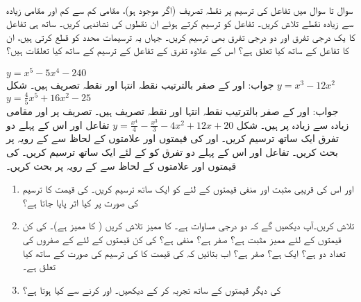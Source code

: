 \\
سوال  تا سوال  میں تفاعل کی ترسیم پر نقطہ تصریف (اگر موجود ہو)، مقامی کم سے کم اور مقامی زیادہ سے زیادہ نقطے  تلاش کریں۔ تفاعل کو ترسیم کرتے ہوئے ان نقطوں کی نشاندہی کریں۔ ساتھ ہی تفاعل کا یک درجی تفرق اور دو درجی تفرق بھی ترسیم کریں۔ جہاں یہ ترسیمات  محدد کو قطع کرتی ہیں، ان کا تفاعل کے ساتھ کیا تعلق ہے؟ اس کے علاوہ تفرق کے تفاعل کے ترسیم کے ساتھ کیا تعلقات ہیں؟ 

$y=x^5-5x^4-240$\\
جواب:\quad
{} اور  کے صفر بالترتیب نقطہ انتہا اور نقطہ تصریف ہیں۔ شکل 
$y=x^3-12x^2$
$y=\tfrac{4}{5}x^5+16x^2-25$\\
جواب:\quad
{} اور  کے صفر بالترتیب نقطہ انتہا اور نقطہ تصریف ہیں۔ تصریف  پر اور مقامی زیادہ سے زیادہ  پر ہیں۔ شکل 
$y=\tfrac{x^4}{4}-\tfrac{x^3}{3}-4x^2+12x+20$
تفاعل  اور اس کے پہلے دو تفرق ایک ساتھ ترسیم کریں۔  اور  کی قیمتوں اور علامتوں کے لحاظ سے  کے رویہ پر بحث کریں۔
تفاعل  اور اس کے پہلے دو تفرق کو  کے لئے ایک ساتھ ترسیم کریں۔  کی قیمتوں اور علامتوں کے لحاظ سے  کے رویہ پر بحث کریں۔
\begin{enumerate}
\item
{} اور  اس کی قریبی مثبت اور منفی قیمتوں کے لئے  کو ایک ساتھ ترسیم کریں۔ کی قیمت کا ترسیم کی صورت پر کیا اثر پایا جاتا ہے؟
\item
{} تلاش کریں۔آپ دیکھیں گے کہ  دو درجی مساوات ہے۔  کا ممیز تلاش کریں ( کا ممیز  ہے)۔  کی کن قیمتوں کے لئے ممیز مثبت ہے؟ صفر ہے؟ منفی ہے؟  کی کن قیمتوں کے لئے  کے  صفروں کی تعداد دو ہے؟ ایک ہے؟  صفر ہے؟ اب بتائیں کہ  کی قیمت کا  کی ترسیم کی صورت کے ساتھ کیا تعلق ہے۔
\item
{} کی دیگر قیمتوں کے ساتھ تجربہ کر کے دیکھیں۔  اور  کرنے سے کیا ہوتا ہے؟
\end{enumerate}

